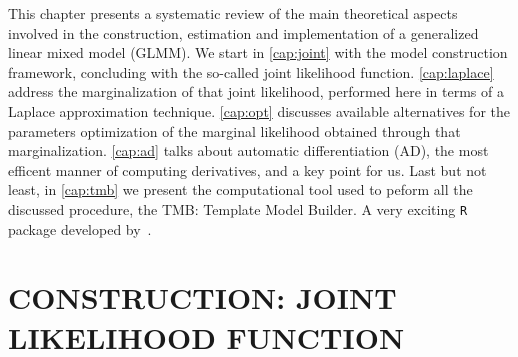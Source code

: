 This chapter presents a systematic review of the main theoretical
aspects involved in the construction, estimation and implementation of a
generalized linear mixed model (GLMM). We start in \autoref{cap:joint}
with the model construction framework, concluding with the so-called
joint likelihood function. \autoref{cap:laplace} address the
marginalization of that joint likelihood, performed here in terms of a
Laplace approximation technique. \autoref{cap:opt} discusses available
alternatives for the parameters optimization of the marginal likelihood
obtained through that marginalization. \autoref{cap:ad} talks about
automatic differentiation (AD), the most efficent manner of computing
derivatives, and a key point for us. Last but not least, in
\autoref{cap:tmb} we present the computational tool used to peform all
the discussed procedure, the TMB: Template Model Builder. A very
exciting \texttt{R} \cite{R20} package developed by~.

\section{CONSTRUCTION: JOINT LIKELIHOOD FUNCTION}
\label{cap:joint}

